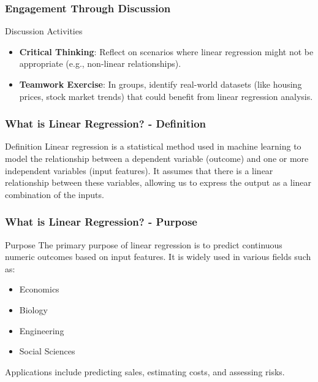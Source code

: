 \documentclass[aspectratio=169]{beamer}
\begin{document}
\begin{frame}[fragile]
    \frametitle{Engagement Through Discussion}
    \begin{block}{Discussion Activities}
        \begin{itemize}
            \item \textbf{Critical Thinking}: Reflect on scenarios where linear regression might not be appropriate (e.g., non-linear relationships).
            \item \textbf{Teamwork Exercise}: In groups, identify real-world datasets (like housing prices, stock market trends) that could benefit from linear regression analysis.
        \end{itemize}
    \end{block}
\end{frame}

\begin{frame}[fragile]
    \frametitle{What is Linear Regression? - Definition}
    \begin{block}{Definition}
        Linear regression is a statistical method used in machine learning to model the relationship between a 
        dependent variable (outcome) and one or more independent variables (input features). It assumes that there 
        is a linear relationship between these variables, allowing us to express the output as a linear combination 
        of the inputs.
    \end{block}
\end{frame}

\begin{frame}[fragile]
    \frametitle{What is Linear Regression? - Purpose}
    \begin{block}{Purpose}
        The primary purpose of linear regression is to predict continuous numeric outcomes based on input 
        features. It is widely used in various fields such as:
        \begin{itemize}
            \item Economics
            \item Biology
            \item Engineering
            \item Social Sciences
        \end{itemize}
        Applications include predicting sales, estimating costs, and assessing risks.
    \end{block}
\end{frame}
\end{document}
